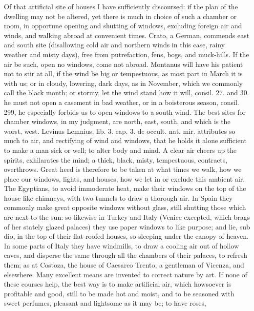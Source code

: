 {Of that artificial site of houses I have sufficiently discoursed: if
the plan of the dwelling may not be altered, yet there is much in
choice of such a chamber or room, in opportune opening and shutting of
windows, excluding foreign air and winds, and walking abroad at
convenient times. Crato, a German, commends east and south site
(disallowing cold air and northern winds in this case, rainy weather
and misty days), free from putrefaction, fens, bogs, and muck-hills. If
the air be such, open no windows, come not abroad. Montanus will have
his patient not to stir at all, if the wind be big or
tempestuous, as most part in March it is with us; or in cloudy,
lowering, dark days, as in November, which we commonly call the black
month; or stormy, let the wind stand how it will, consil. 27. and 30.
he must not open a casement in bad weather, or in a boisterous
season, consil. 299, he especially forbids us to open windows to a
south wind. The best sites for chamber windows, in my judgment, are
north, east, south, and which is the worst, west. Levinus Lemnius, lib.
3. cap. 3. de occult. nat. mir. attributes so much to air, and
rectifying of wind and windows, that he holds it alone sufficient to
make a man sick or well; to alter body and mind. A clear air
cheers up the spirits, exhilarates the mind; a thick, black, misty,
tempestuous, contracts, overthrows. Great heed is therefore to be taken
at what times we walk, how we place our windows, lights, and houses,
how we let in or exclude this ambient air. The Egyptians, to avoid
immoderate heat, make their windows on the top of the house like
chimneys, with two tunnels to draw a thorough air. In Spain they
commonly make great opposite windows without glass, still shutting
those which are next to the sun: so likewise in Turkey and Italy
(Venice excepted, which brags of her stately glazed palaces) they use
paper windows to like purpose; and lie, sub dio, in the top of their
flat-roofed houses, so sleeping under the canopy of heaven. In some
parts of Italy they have windmills, to draw a cooling air out of
hollow caves, and disperse the same through all the chambers of their
palaces, to refresh them; as at Costoza, the house of Caesareo Trento,
a gentleman of Vicenza, and elsewhere. Many excellent means are
invented to correct nature by art. If none of these courses help, the
best way is to make artificial air, which howsoever is profitable and
good, still to be made hot and moist, and to be seasoned with sweet
perfumes, pleasant and lightsome as it may be; to have roses,
}
